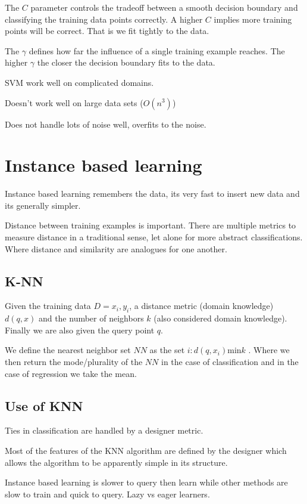 \documentclass{article}
\begin{document}
The $C$ parameter controls the tradeoff between a smooth decision boundary and
classifying the training data points correctly. A higher $C$ implies more
training points will be correct. That is we fit tightly to the data. 

The $\gamma$ defines how far the influence of a single training example reaches. 
The higher $\gamma$ the closer the decision boundary fits to the data.

SVM work well on complicated domains. 

Doesn't work well on large data sets ($O(n^3)$)

Does not handle lots of noise well, overfits to the noise. 

\section{Instance based learning}
Instance based learning remembers the data, its very fast to insert new data and
its generally simpler.

Distance between training examples is important. There are multiple metrics
to measure distance in a traditional sense, let alone for more abstract 
classifications. Where distance and similarity are analogues for one another.  

\subsection{K-NN}
Given the training data $D = {x_i, y_i}$, a distance metric (domain knowledge)
$d(q,x)$ and the number of neighbors $k$ (also considered domain knowledge).
Finally we are also given the query point $q$. 

We define the nearest neighbor set $NN$ as the set ${i: d(q, x_i) \text{min} k}$
. Where we then return the mode/plurality of the $NN$ in the case of
classification and in the case of regression we take the mean. 

\subsection{Use of KNN}
Ties in classification are handled by a designer metric. 

Most of the features of the KNN algorithm are defined by the designer which 
allows the algorithm to be apparently simple in its structure. 

Instance based learning is slower to query then learn while other methods are
slow to train and quick to query. Lazy vs eager learners.
\end{document}
